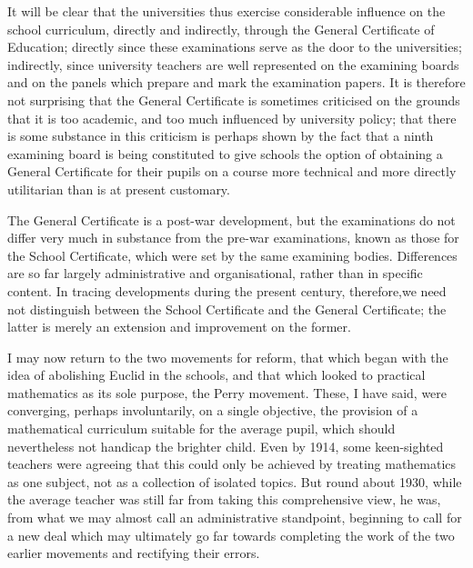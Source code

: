 It will be clear that the universities thus exercise considerable influence on the school curriculum, directly and indirectly, through the General Certificate of Education; directly since these examinations serve as the door to the universities; indirectly, since university teachers are well represented on the examining boards and on the panels which prepare and mark the examination papers. It is therefore not surprising that the General Certificate is sometimes criticised on the grounds that it is too academic, and too much influenced by university policy; that there is some substance in this criticism is perhaps shown by the fact that a ninth examining board is being constituted to give schools the option of obtaining a General Certificate for their pupils on a course more technical and more directly utilitarian than is at present customary.

The General Certificate is a post-war development, but the examinations do not differ very much in substance from the pre-war examinations, known as those for the School Certificate, which were set by the same examining bodies. Differences are so far largely administrative and organisational, rather than in specific content. In tracing developments during the present century, therefore,\pageoriginale we need not distinguish between the School Certificate and the General Certificate; the latter is merely an extension and improvement on the former.

I may now return to the two movements for reform, that which began with the idea of abolishing Euclid in the schools, and that which looked to practical mathematics as its sole purpose, the Perry movement. These, I have said, were converging, perhaps involuntarily, on a single objective, the provision of a mathematical curriculum suitable for the average pupil, which should nevertheless not handicap the brighter child. Even by 1914, some keen-sighted teachers were agreeing that this could only be achieved by treating mathematics as one subject, not as a collection of isolated topics. But round about 1930, while the average teacher was still far from taking this comprehensive view, he was, from what we may almost call an administrative standpoint, beginning to call for a new deal which may ultimately go far towards completing the work of the two earlier movements and rectifying their errors.

